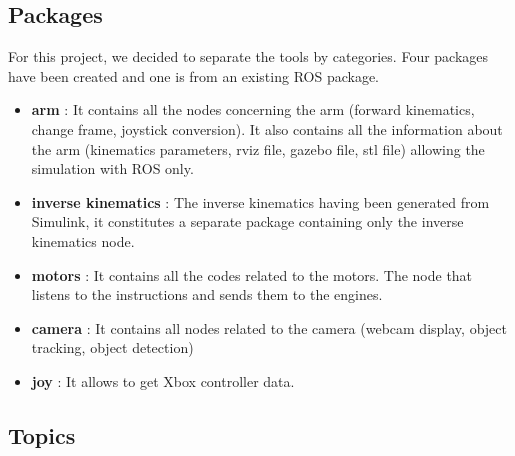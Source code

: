 \subsection{Packages}
For this project, we decided to separate the tools by categories. Four packages have been created and one is from an existing ROS package.
\begin{itemize}
    \item \textbf{arm} : It contains all the nodes concerning the arm (forward kinematics, change frame, joystick conversion). It also contains all the information about the arm (kinematics parameters, rviz file, gazebo file, stl file) allowing the simulation with ROS only.
    \item \textbf{inverse kinematics} : The inverse kinematics having been generated from Simulink, it constitutes a separate package containing only the inverse kinematics node.
    \item  \textbf{motors} : It contains all the codes related to the motors. The node that listens to the instructions and sends them to the engines.
    \item  \textbf{camera} : It contains all nodes related to the camera (webcam display, object tracking, object detection)
    \item  \textbf{joy} : It allows to get Xbox controller data.
\end{itemize}

\subsection{Topics}

